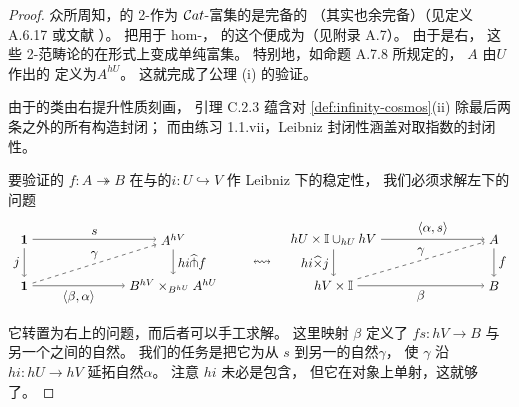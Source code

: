 \begin{proof}
众所周知，\trCategory{}的 2-\trCategory{}作为 $\mathcal{C}at$-富集的\trCategory{}是完备的
（其实也余完备）（见定义 A.6.17 或文献 \cite{bib67}）。
把\trNerve\trFunctor{}用于 hom-\trCategory{}，
\trCategory{}的这个\trEnrichedCategory{}便成为\trQuasiCategory\trEnrichedCategory{}（见附录 A.7）。
由于\trNerve\trFunctor{}是右\trAdjunction{}，
这些 2-范畴论的\trLimit{}在形式上变成单纯富集\trLimit{}。
特别地，如命题 A.7.8 所规定的，
\trCategory{} $A$ 由\trSimplicialSet $U$ 作出的\trCotensor
定义为\trFunctor{}\trCategory $A^{hU}$。
这就完成了公理 (i) 的验证。

由于\trIsofibration{}的类由右提升性质刻画，
引理 C.2.3 蕴含\trIsofibration{}对 \cref{def:infinity-cosmos}(ii)
除最后两条之外的所有\trLimit{}构造封闭；
而由练习 1.1.vii，Leibniz 封闭性涵盖对取指数的封闭性。

要验证\trCategory{}的\trIsofibration{} $f\colon A\twoheadrightarrow B$
在与\trSimplicialSet{}的\trMonomorphism $i\colon U\hookrightarrow V$
作 Leibniz \trCotensor{}下的稳定性，
我们必须求解左下的\trLifting{}问题
\begin{equation*}
\begin{tikzpicture}[xscale=1.55,yscale=1.25]
\node (TL) at (0,1) {$\mathbf{1}$};
\node (TR) at (2.6,1) {$A^{hV}$};
\node (BL) at (0,0) {$\mathbf{1}$};
\node (BR) at (2.6,0) {$B^{hV}\times_{B^{hU}}A^{hU}$};
\draw[->] (TL) -- (TR) node[midway,above]{$s$};
\draw[->] (TL) -- (BL) node[midway,left]{$j$};
\draw[->] (BL) -- (BR) node[midway,below]{$\langle\beta,\alpha\rangle$};
\draw[->] (TR) -- (BR) node[midway,right]{$hi\widehat{\pitchfork}f$};
\draw[dashed,->] (BL) -- (TR) node[midway,above]{$\gamma$};
\node at (4.15,0.5) {$\leftrightsquigarrow$};
\node (rTL) at (5.4,1) {$hU\times\mathbb{I}\cup_{hU}hV$};
\node (rTR) at (8.2,1) {$A$};
\node (rBL) at (5.4,0) {$hV\times\mathbb{I}$};
\node (rBR) at (8.2,0) {$B$};
\draw[->] (rTL) -- (rTR) node[midway,above]{$\langle\alpha,s\rangle$};
\draw[->] (rTL) -- (rBL) node[midway,left]{$hi\widehat{\times}j$};
\draw[->] (rBL) -- (rBR) node[midway,below]{$\beta$};
\draw[->] (rTR) -- (rBR) node[midway,right]{$f$};
\draw[dashed,->] (rBL) -- (rTR) node[midway,above]{$\gamma$};
\end{tikzpicture}
\end{equation*}
它转置为右上的\trLifting{}问题，而后者可以手工求解。
这里映射 $\beta$ 定义了 $fs\colon hV\to B$
与另一个\trFunctor{}之间的自然\trIsomorphism{}。
我们的任务是把它\trLifting{}为从 $s$ 到另一\trFunctor{}的自然\trIsomorphism $\gamma$，
使 $\gamma$ 沿 $hi\colon hU\to hV$ 延拓自然\trIsomorphism $\alpha$。
注意\trFunctor{} $hi$ 未必是包含，
但它在对象上单射，这就够了。


\end{proof}
